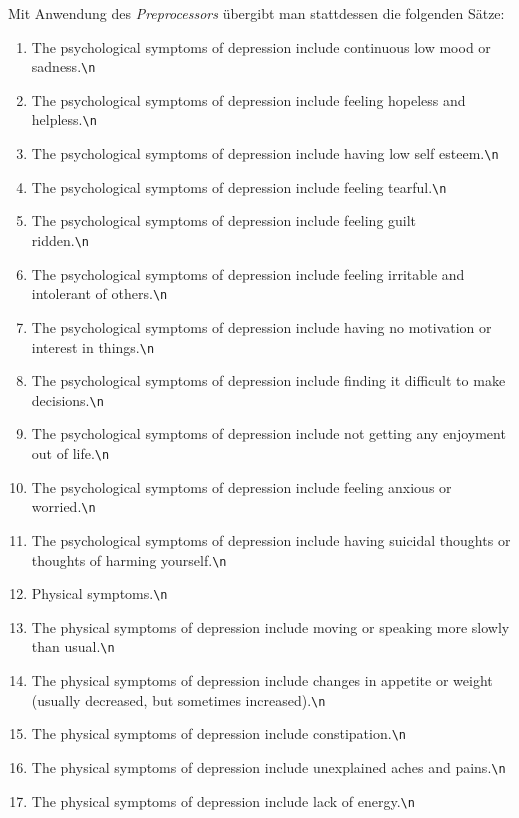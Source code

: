 Mit Anwendung des \emph{Preprocessors} übergibt man stattdessen die folgenden Sätze:
\begin{enumerate}
	\item \glqq The psychological symptoms of depression include continuous low mood or sadness.\verb!\n!\grqq
	\item \glqq The psychological symptoms of depression include feeling hopeless and helpless.\verb!\n!\grqq
	\item \glqq The psychological symptoms of depression include having low self esteem.\verb!\n!\grqq
	\item \glqq The psychological symptoms of depression include feeling tearful.\verb!\n!\grqq
	\item \glqq The psychological symptoms of depression include feeling guilt \\ridden.\verb!\n!\grqq
	\item \glqq The psychological symptoms of depression include feeling irritable and intolerant of others.\verb!\n!\grqq
	\item \glqq The psychological symptoms of depression include having no motivation or interest in things.\verb!\n!\grqq
	\item \glqq The psychological symptoms of depression include finding it difficult to make decisions.\verb!\n!\grqq
	\item \glqq The psychological symptoms of depression include not getting any enjoyment out of life.\verb!\n!\grqq
	\item \glqq The psychological symptoms of depression include feeling anxious or worried.\verb!\n!\grqq
	\item \glqq The psychological symptoms of depression include having suicidal thoughts or thoughts of harming yourself.\verb!\n!\grqq
	\item \glqq Physical symptoms.\verb!\n!\grqq
	\item \glqq The physical symptoms of depression include moving or speaking more slowly than usual.\verb!\n!\grqq
	\item \glqq The physical symptoms of depression include changes in appetite or weight (usually decreased, but sometimes increased).\verb!\n!\grqq
	\item \glqq The physical symptoms of depression include constipation.\verb!\n!\grqq
	\item \glqq The physical symptoms of depression include unexplained aches and pains.\verb!\n!\grqq
	\item \glqq The physical symptoms of depression include lack of energy.\verb!\n!\grqq

\end{enumerate}

